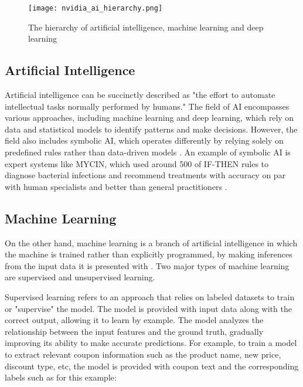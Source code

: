 \documentclass[licencjacka,en]{pracamgr}
\begin{document}
\begin{figure}
    \centering
    \texttt{[image: nvidia\_ai\_hierarchy.png]}
    \caption{The hierarchy of artificial intelligence, machine learning and deep learning \cite{nvidiaimage}}
    \label{fig:hierarchy-ai-ml-dl}
\end{figure}

\subsection{Artificial Intelligence}
Artificial intelligence can be succinctly described as "the effort to automate intellectual tasks normally performed by humans." The field of AI encompasses various approaches, including machine learning and deep learning, which rely on data and statistical models to identify patterns and make decisions. However, the field also includes symbolic AI, which operates differently by relying solely on predefined rules rather than data-driven models \cite{francuz_2}. An example of symbolic AI is expert systems like MYCIN, which used around 500 of IF-THEN rules to diagnose bacterial infections and recommend treatments with accuracy on par with human specialists and better than general practitioners \cite{mycin}.

\subsection{Machine Learning}
On the other hand, machine learning is a branch of artificial intelligence in which the machine is trained rather than explicitly programmed, by making inferences from the input data it is presented with \cite{francuz_3}. Two major types of machine learning are supervised and unsupervised learning.

Supervised learning refers to an approach that relies on labeled datasets to train or "supervise" the model. The model is provided with input data along with the correct output, allowing it to learn by example. The model analyzes the relationship between the input features and the ground truth, gradually improving its ability to make accurate predictions. For example, to train a model to extract relevant coupon information such as the product name, new price, discount type, etc, the model is provided with coupon text and the corresponding labels such as for this example:
\end{document}

